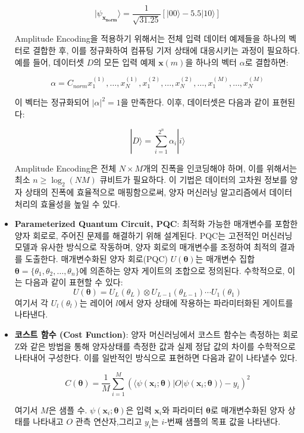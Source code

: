 \begin{itemize}
    \[
    |\psi_{\mathbf{x_{norm}}}\rangle = \frac{1}{\sqrt{31.25}} \left[ |00\rangle - 5.5|10\rangle \right]
    \]

    Amplitude Encoding을 적용하기 위해서는 전체 입력 데이터 예제들을 하나의 벡터로 결합한 후, 이를 정규화하여 컴퓨팅 기저 상태에 대응시키는 과정이 필요하다. 예를 들어, 데이터셋 \( D \)의 모든 입력 예제 \( \mathbf{x}(m) \)을 하나의 벡터 \( \alpha \)로 결합하면:

    \[
    \alpha = C_{norm} x^{(1)}_1, \ldots, x^{(1)}_N, x^{(2)}_1, \ldots, x^{(2)}_N, \ldots, x^{(M)}_1, \ldots, x^{(M)}_N
    \]

    이 벡터는 정규화되어 \( |\alpha|^2 = 1 \)을 만족한다. 이후, 데이터셋은 다음과 같이 표현된다:

    \[
    |D\rangle = \sum_{i=1}^{2^n} \alpha_i |i\rangle
    \]

    Amplitude Encoding은 전체 \( N \times M \)개의 진폭을 인코딩해야 하며, 이를 위해서는 최소 \( n \geq \log_2(NM) \) 큐비트가 필요하다. 이 기법은 데이터의 고차원 정보를 양자 상태의 진폭에 효율적으로 매핑함으로써, 양자 머신러닝 알고리즘에서 데이터 처리의 효율성을 높일 수 있다.

    \item \textbf{Parameterized Quantum Circuit, PQC}: 최적화 가능한 매개변수를 포함한 양자 회로로, 주어진 문제를 해결하기 위해 설계된다. PQC는 고전적인 머신러닝 모델과 유사한 방식으로 작동하며, 양자 회로의 매개변수를 조정하여 최적의 결과를 도출한다. 매개변수화된 양자 회로(PQC) \( U(\boldsymbol{\theta}) \)는 매개변수 집합 \( \boldsymbol{\theta} = \{\theta_1, \theta_2, \ldots, \theta_n\} \)에 의존하는 양자 게이트의 조합으로 정의된다. 수학적으로, 이는 다음과 같이 표현할 수 있다:
    \[
        U(\boldsymbol{\theta}) = U_L(\theta_L) \otimes U_{L-1}(\theta_{L-1}) \cdots U_1(\theta_1)
    \]
    여기서 각 \( U_l(\theta_l) \)는 레이어 \( l \)에서 양자 상태에 작용하는 파라미터화된 게이트를 나타낸다.

    \item \textbf{코스트 함수 (Cost Function)}: 양자 머신러닝에서 코스트 함수는  측정하는 회로 Z와 같은 방법을 통해 양자상태를 측정한 값과 실제 정답 값의 차이를 수학적으로 나타내어 구성한다. 이를 일반적인 방식으로 표현하면 다음과 같이 나타낼수 있다.

    \[
    C(\boldsymbol{\theta}) = \frac{1}{M} \sum_{i=1}^{M} \left( \langle \psi(\mathbf{x}_i; \boldsymbol{\theta}) | O | \psi(\mathbf{x}_i; \boldsymbol{\theta}) \rangle - y_i \right)^2
    \]

    여기서 \( M \)은  샘플 수.  \( \psi(\mathbf{x}_i; \boldsymbol{\theta}) \)은 입력 \( \mathbf{x}_i \)와 파라미터 \( \boldsymbol{\theta} \)로 매개변수화된 양자 상태를 나타내고 \( O \) 관측 연산자,그리고
       \( y_i \)는 \( i \)-번째 샘플의 목표 값을 나타낸다.

\end{itemize}

